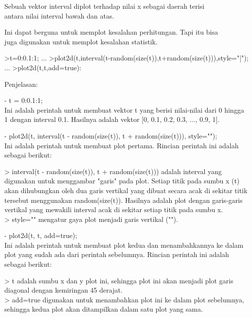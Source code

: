 \documentclass[a4paper,10pt]{article}
\begin{document}
\begin{eulernotebook}
\begin{eulercomment}
\begin{eulercomment}
\begin{eulercomment}
\begin{eulercomment}
\begin{eulercomment}
\begin{eulercomment}
\begin{eulercomment}
\begin{eulercomment}
\begin{eulercomment}
\begin{eulercomment}
\begin{eulercomment}
\begin{eulercomment}
\begin{eulercomment}
\end{eulercomment}
\begin{eulercomment}
Sebuah vektor interval diplot terhadap nilai x sebagai daerah terisi\\
antara nilai interval bawah dan atas.

Ini dapat berguna untuk memplot kesalahan perhitungan. Tapi itu bisa\\
juga digunakan untuk memplot kesalahan statistik.
\end{eulercomment}
\begin{eulerprompt}
>t=0:0.1:1; ...
>plot2d(t,interval(t-random(size(t)),t+random(size(t))),style="|");  ...
>plot2d(t,t,add=true):
\end{eulerprompt}
\begin{eulercomment}
Penjelasan:

- t = 0:0.1:1;\\
Ini adalah perintah untuk membuat vektor t yang berisi nilai-nilai
dari 0 hingga 1 dengan interval 0.1. Hasilnya adalah vektor [0, 0.1,
0.2, 0.3, ..., 0.9, 1].

- plot2d(t, interval(t - random(size(t)), t + random(size(t))),
style="\textbar{}");\\
Ini adalah perintah untuk membuat plot pertama. Rincian perintah ini
adalah sebagai berikut:

\textgreater{} interval(t - random(size(t)), t + random(size(t))) adalah interval
yang digunakan untuk menggambar "garis" pada plot. Setiap titik pada
sumbu x (t) akan dihubungkan oleh dua garis vertikal yang dibuat
secara acak di sekitar titik tersebut menggunakan random(size(t)).
Hasilnya adalah plot dengan garis-garis vertikal yang mewakili
interval acak di sekitar setiap titik pada sumbu x.\\
\textgreater{} style="\textbar{}" mengatur gaya plot menjadi garis vertikal ("\textbar{}").

- plot2d(t, t, add=true);\\
Ini adalah perintah untuk membuat plot kedua dan menambahkannya ke
dalam plot yang sudah ada dari perintah sebelumnya. Rincian perintah
ini adalah sebagai berikut:

\textgreater{} t adalah sumbu x dan y plot ini, sehingga plot ini akan menjadi plot
garis diagonal dengan kemiringan 45 derajat.\\
\textgreater{} add=true digunakan untuk menambahkan plot ini ke dalam plot
sebelumnya, sehingga kedua plot akan ditampilkan dalam satu plot yang
sama.


\end{eulercomment}
\end{eulercomment}
\end{eulercomment}
\end{eulercomment}
\end{eulercomment}
\end{eulercomment}
\end{eulercomment}
\end{eulercomment}
\end{eulercomment}
\end{eulercomment}
\end{eulercomment}
\end{eulercomment}
\end{eulercomment}
\end{eulernotebook}
\end{document}
